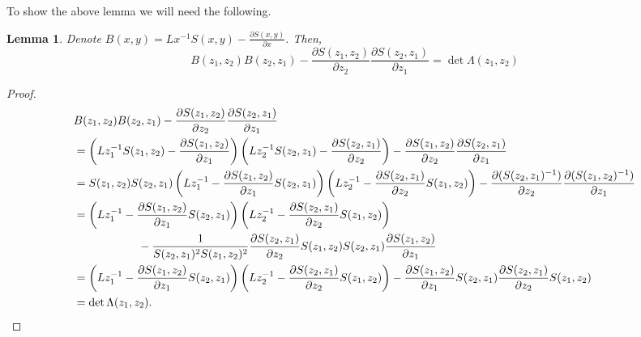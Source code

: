 \documentclass[a4paper,11pt]{article}
\newtheorem{lemma}[theorem]{Lemma}
\theoremstyle{definition}
\begin{document}
To show the above lemma we will need the following.
\begin{lemma} \label{l: denominator to lambda determinant}
    Denote $B(x,y) = Lx^{-1}S(x,y) - \frac{\partial S(x,y)}{\partial x}$. Then,
    \begin{equation}
        B(z_1,z_2)B(z_2,z_1) - \frac{\partial S(z_1,z_2)}{\partial z_2}\frac{\partial S(z_2,z_1)}{\partial z_1} = \det \Lambda(z_1,z_2)
    \end{equation}
\end{lemma}

\begin{proof}
    \begin{equation}
        \begin{split}
            &B(z_1,z_2)B(z_2,z_1) - \frac{\partial S(z_1,z_2)}{\partial z_2}\frac{\partial S(z_2,z_1)}{\partial z_1} \\
            &= \left( Lz_1^{-1}S(z_1,z_2) - \frac{\partial S(z_1,z_2)}{\partial z_1}\right)\left(Lz_2^{-1}S(z_2,z_1) - \frac{\partial S(z_2,z_1)}{\partial z_2} \right) - \frac{\partial S(z_1,z_2)}{\partial z_2}\frac{\partial S(z_2,z_1)}{\partial z_1} \\
            &= S(z_1,z_2)S(z_2,z_1)\left( Lz_1^{-1} - \frac{\partial S(z_1,z_2)}{\partial z_1}S(z_2,z_1)\right)\left(Lz_2^{-1} - \frac{\partial S(z_2,z_1)}{\partial z_2}S(z_1,z_2) \right) - \frac{\partial (S(z_2,z_1)^{-1})}{\partial z_2}\frac{\partial (S(z_1,z_2)^{-1})}{\partial z_1} \\ 
            &=\left( Lz_1^{-1} - \frac{\partial S(z_1,z_2)}{\partial z_1}S(z_2,z_1)\right)\left(Lz_2^{-1} - \frac{\partial S(z_2,z_1)}{\partial z_2}S(z_1,z_2) \right)\\
            &\hspace{20mm} - \frac{1}{S(z_2,z_1)^2S(z_1,z_2)^2}\frac{\partial S(z_2,z_1)}{\partial z_2}S(z_1,z_2)S(z_2,z_1)\frac{\partial S(z_1,z_2)}{\partial z_1} \\
            &=\left( Lz_1^{-1} - \frac{\partial S(z_1,z_2)}{\partial z_1}S(z_2,z_1)\right)\left(Lz_2^{-1} - \frac{\partial S(z_2,z_1)}{\partial z_2}S(z_1,z_2) \right) - \frac{\partial S(z_1,z_2)}{\partial z_1}S(z_2,z_1)\frac{\partial S(z_2,z_1)}{\partial z_2}S(z_1,z_2) \\
            &= \det \Lambda(z_1,z_2). 
        \end{split}
    \end{equation}
\end{proof}
\end{document}
